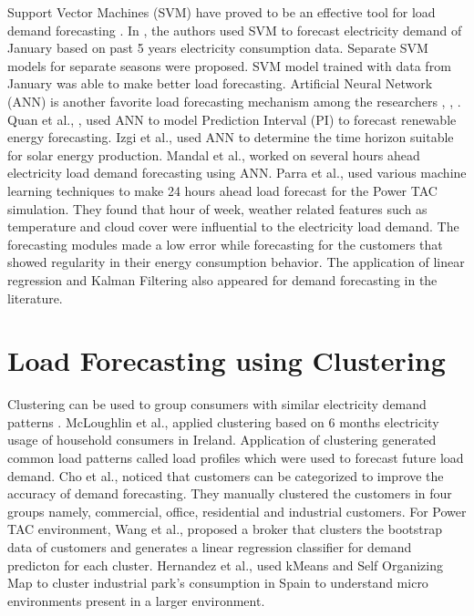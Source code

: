 Support Vector Machines (SVM) have proved to be an effective tool for load demand forecasting \cite{sapankevych2009time, chen2004load}. In \cite{chen2004load}, the authors used SVM to forecast electricity demand of January based on past 5 years electricity consumption data. Separate SVM models for separate seasons were proposed. SVM model trained with data from January was able to make better load forecasting. Artificial Neural Network (ANN) is another favorite load forecasting mechanism among the researchers \cite{izgi2012short}, \cite{quan2014short}, \cite{hsu2003regional}. Quan et al., \cite{quan2014short}, used ANN to model Prediction Interval (PI) to forecast renewable energy forecasting. Izgi et al.,  \cite{izgi2012short} used ANN to determine the time horizon suitable for solar energy production. Mandal et al., \cite{mandal2006neural} worked on several hours ahead electricity load demand forecasting using ANN. Parra \cite{parra2013initial} et al., used various machine learning techniques to make 24 hours ahead load forecast for the Power TAC simulation. They found that hour of week, weather related features such as temperature and cloud cover were influential to the electricity load demand. The forecasting modules made a low error while forecasting for the customers that showed regularity in their energy consumption behavior. The application of linear regression \cite{mcloughlin2015clustering, hernandez2012classification} and Kalman Filtering \cite{al2004short} also appeared for demand forecasting in the literature. 

\section {Load Forecasting using Clustering}

Clustering can be used to group consumers with similar electricity demand patterns \cite{hernandez2012classification}. McLoughlin et al., \cite{mcloughlin2015clustering} applied clustering based on 6 months electricity usage of household consumers in Ireland. Application of clustering generated common load patterns called load profiles which were used to forecast future load demand. Cho \cite{cho1995customer} et al., noticed that customers can be categorized to improve the accuracy of demand forecasting. They manually clustered the customers in four groups namely, commercial, office, residential and industrial customers. For Power TAC environment, Wang et al., \cite{wang2015gongbroker} proposed a broker that clusters the bootstrap data of customers and generates a linear regression classifier for demand predicton for each cluster.  Hernandez et al., \cite{hernandez2012classification} used kMeans and Self Organizing Map to cluster industrial park's consumption in Spain to understand micro environments present in a larger environment.


